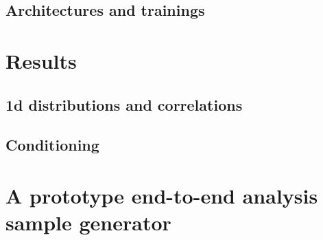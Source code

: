 \subsection{Architectures and trainings}

\section{Results}

\subsection{1d distributions and correlations}

\subsection{Conditioning}

\section{A prototype end-to-end analysis sample generator}
